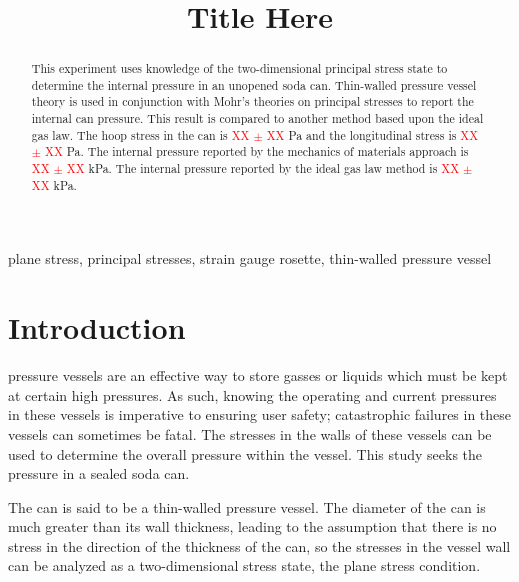 \documentclass[10pt,journal,letterpaper]{IEEEtran}
\begin{document}
\title{Title Here}

\author{
}

\maketitle
\thispagestyle{empty}

\begin{abstract}
This experiment uses knowledge of the two-dimensional principal stress state to determine the internal pressure in an unopened soda can.
Thin-walled pressure vessel theory is used in conjunction with Mohr’s theories on principal stresses to report the internal can pressure.
This result is compared to another method based upon the ideal gas law.
The hoop stress in the can is \textcolor{red}{XX $\pm$ XX} Pa and the longitudinal stress is \textcolor{red}{XX $\pm$ XX} Pa.
The internal pressure reported by the mechanics of materials approach is \textcolor{red}{XX $\pm$ XX} kPa.
The internal pressure reported by the ideal gas law method is \textcolor{red}{XX $\pm$ XX} kPa.

\end{abstract}

\begin{IEEEkeywords}
plane stress, principal stresses, strain gauge rosette, thin-walled pressure vessel
\end{IEEEkeywords}

\section{Introduction}
 pressure vessels are an effective way to store gasses or liquids which must be kept at certain high pressures.
As such, knowing the operating and current pressures in these vessels is imperative to ensuring user safety; catastrophic failures in these vessels can sometimes be fatal.
The stresses in the walls of these vessels can be used to determine the overall pressure within the vessel.
This study seeks the pressure in a sealed soda can.

The can is said to be a thin-walled pressure vessel.
The diameter of the can is much greater than its wall thickness, leading to the  assumption that there is no stress in the direction of the thickness of the can, so the stresses in the vessel wall can be analyzed as a two-dimensional stress state, the plane stress condition.
\end{document}
